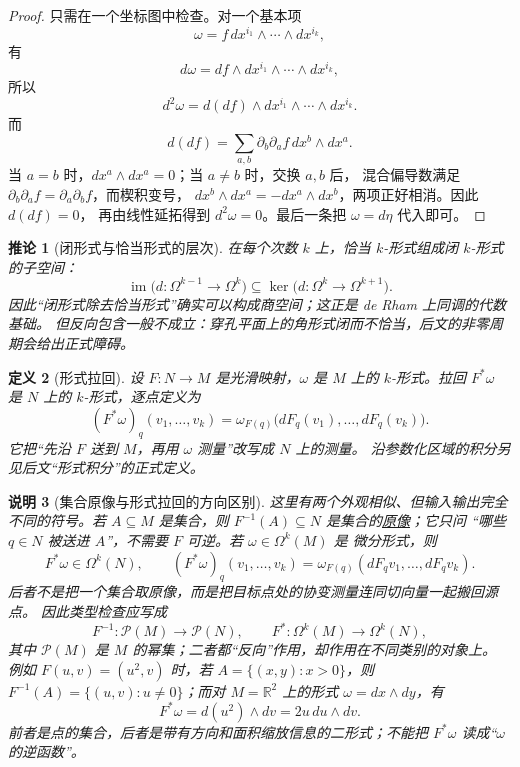 \documentclass[UTF8,fontset=none,a4paper,11pt]{ctexart}
\theoremstyle{foundation-definition}
\newtheorem{definition}{定义}[section]
\theoremstyle{foundation-theorem}
\theoremstyle{foundation-proposition}
\theoremstyle{foundation-example}
\theoremstyle{foundation-remark}
\newtheorem{remark}[definition]{说明}
\theoremstyle{foundation-theorem}
\newtheorem{corollary}[definition]{推论}
\newcommand{\term}[2]{\hyperref[#1]{#2}}
\begin{document}
\begin{proof}
只需在一个坐标图中检查。对一个基本项
\[
\omega=f\,dx^{i_1}\wedge\cdots\wedge dx^{i_k},
\]
有
\[
d\omega=df\wedge dx^{i_1}\wedge\cdots\wedge dx^{i_k},
\]
所以
\[
d^2\omega=d(df)\wedge dx^{i_1}\wedge\cdots\wedge dx^{i_k}.
\]
而
\[
d(df)=\sum_{a,b}\partial_b\partial_a f\,dx^b\wedge dx^a.
\]
当 \(a=b\) 时，\(dx^a\wedge dx^a=0\)；当 \(a\ne b\) 时，交换 \(a,b\) 后，
混合偏导数满足 \(\partial_b\partial_a f=\partial_a\partial_b f\)，而楔积变号，
\(dx^b\wedge dx^a=-dx^a\wedge dx^b\)，两项正好相消。因此 \(d(df)=0\)，
再由线性延拓得到 \(d^2\omega=0\)。最后一条把 \(\omega=d\eta\) 代入即可。
\end{proof}

\begin{corollary}[闭形式与恰当形式的层次]
在每个次数 \(k\) 上，恰当 \(k\)-形式组成闭 \(k\)-形式的子空间：
\[
\operatorname{im}\bigl(d:\Omega^{k-1}\to\Omega^k\bigr)
\subseteq
\ker\bigl(d:\Omega^k\to\Omega^{k+1}\bigr).
\]
因此“闭形式除去恰当形式”确实可以构成商空间；这正是 de Rham 上同调的代数基础。
但反向包含一般不成立：穿孔平面上的角形式闭而不恰当，后文的非零周期会给出正式障碍。
\end{corollary}

\begin{definition}[形式拉回]\label{def:form-pullback}
设 \(F:N\to M\) 是光滑映射，\(\omega\) 是 \(M\) 上的 \(k\)-形式。拉回
\(F^*\omega\) 是 \(N\) 上的 \(k\)-形式，逐点定义为
\[
(F^*\omega)_q(v_1,\ldots,v_k)
=\omega_{F(q)}\bigl(dF_q(v_1),\ldots,dF_q(v_k)\bigr).
\]
它把“先沿 \(F\) 送到 \(M\)，再用 \(\omega\) 测量”改写成 \(N\) 上的测量。
沿参数化区域的积分另见后文“形式积分”的正式定义。
\end{definition}

\begin{remark}[集合原像与形式拉回的方向区别]\label{rem:preimage-vs-form-pullback}
这里有两个外观相似、但输入输出完全不同的符号。若 \(A\subseteq M\) 是集合，则
\(F^{-1}(A)\subseteq N\) 是集合的\term{def:preimage}{原像}；它只问
“哪些 \(q\in N\) 被送进 \(A\)”，不需要 \(F\) 可逆。若 \(\omega\in\Omega^k(M)\) 是
微分形式，则
\[
F^*\omega\in\Omega^k(N),
\qquad
(F^*\omega)_q(v_1,\ldots,v_k)
=\omega_{F(q)}(dF_qv_1,\ldots,dF_qv_k).
\]
后者不是把一个集合取原像，而是把目标点处的协变测量连同切向量一起搬回源点。
因此类型检查应写成
\[
F^{-1}:\mathcal P(M)\longrightarrow\mathcal P(N),
\qquad
F^*:\Omega^k(M)\longrightarrow\Omega^k(N),
\]
其中 \(\mathcal P(M)\) 是 \(M\) 的幂集；二者都“反向”作用，却作用在不同类别的对象上。
例如 \(F(u,v)=(u^2,v)\) 时，若 \(A=\{(x,y):x>0\}\)，则
\(F^{-1}(A)=\{(u,v):u\ne0\}\)；而对 \(M=\mathbb R^2\) 上的形式
\(\omega=dx\wedge dy\)，有
\[
F^*\omega=d(u^2)\wedge dv=2u\,du\wedge dv.
\]
前者是点的集合，后者是带有方向和面积缩放信息的二形式；不能把 \(F^*\omega\)
读成“\(\omega\) 的逆函数”。
\end{remark}
\end{document}
